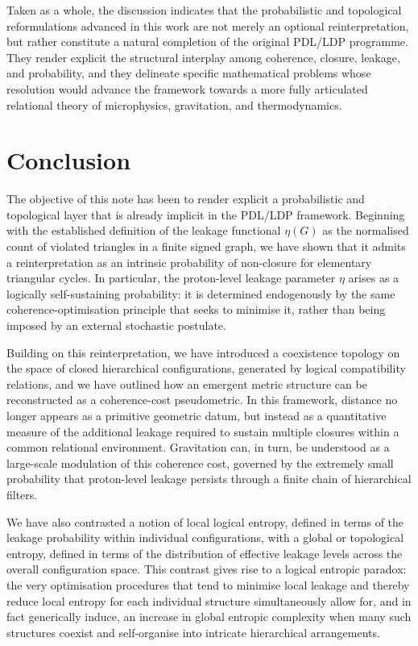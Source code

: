 \documentclass[11pt,a4paper]{article}
\theoremstyle{definition}
\newcommand{\etaL}{\eta} %
\begin{document}
Taken as a whole, the discussion indicates that the probabilistic and topological reformulations advanced in this work are not merely an optional reinterpretation, but rather constitute a natural completion of the original PDL/LDP programme. They render explicit the structural interplay among coherence, closure, leakage, and probability, and they delineate specific mathematical problems whose resolution would advance the framework towards a more fully articulated relational theory of microphysics, gravitation, and thermodynamics.

\section{Conclusion}

The objective of this note has been to render explicit a probabilistic and topological layer that is already implicit in the PDL/LDP framework. Beginning with the established definition of the leakage functional \(\eta(G)\) as the normalised count of violated triangles in a finite signed graph, we have shown that it admits a reinterpretation as an intrinsic probability of non-closure for elementary triangular cycles. In particular, the proton-level leakage parameter \(\etaL\) arises as a logically self-sustaining probability: it is determined endogenously by the same coherence-optimisation principle that seeks to minimise it, rather than being imposed by an external stochastic postulate.

Building on this reinterpretation, we have introduced a coexistence topology on the space of closed hierarchical configurations, generated by logical compatibility relations, and we have outlined how an emergent metric structure can be reconstructed as a coherence-cost pseudometric. In this framework, distance no longer appears as a primitive geometric datum, but instead as a quantitative measure of the additional leakage required to sustain multiple closures within a common relational environment. Gravitation can, in turn, be understood as a large-scale modulation of this coherence cost, governed by the extremely small probability that proton-level leakage persists through a finite chain of hierarchical filters.

We have also contrasted a notion of local logical entropy, defined in terms of the leakage probability within individual configurations, with a global or topological entropy, defined in terms of the distribution of effective leakage levels across the overall configuration space. This contrast gives rise to a logical entropic paradox: the very optimisation procedures that tend to minimise local leakage and thereby reduce local entropy for each individual structure simultaneously allow for, and in fact generically induce, an increase in global entropic complexity when many such structures coexist and self-organise into intricate hierarchical arrangements.
\end{document}
